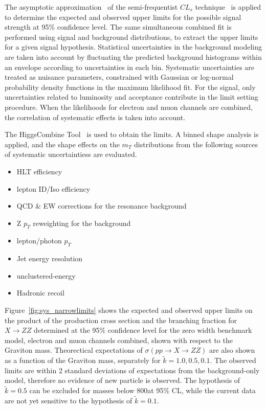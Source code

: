 \vspace{0.3cm}
The asymptotic approximation~\cite{sys_cls0} of the semi-frequentist $CL_s$ technique~\cite{sys_cls1,sys_cls2,sys_cls3} is applied to determine the expected and observed upper limits for the possible signal strength at 95\% confidence level. The same simultaneous combined fit is performed using signal and background distributions, to extract the upper limits for a given signal hypothesis. Statistical uncertainties in the background modeling are taken into account by fluctuating the predicted background histograms within an envelope according to uncertainties in each bin. Systematic uncertainties are treated as nuisance parameters, constrained with Gaussian or log-normal probability density functions in the maximum likelihood fit. For the signal, only uncertainties related to luminosity and acceptance contribute in the limit setting procedure. When the likelihoods for electron and muon channels are combined, the correlation of systematic effects is taken into account. 

\vspace{0.3cm}
The HiggsCombine Tool~\cite{sys_higgscombinetool} is used to obtain the limits. A binned shape analysis is applied, and the shape effects on the $m_T$ distributions from the following sources of systematic uncertaintiess are evaluated.
\begin{itemize}
\item HLT efficiency
\item lepton ID/Iso efficiency
\item QCD \& EW corrections for the resonance background
\item Z $p_T$ reweighting for the \Zjets background
\item \ptmiss lepton/photon $p_T$
\item \ptmiss Jet energy resolution
\item \ptmiss unclustered-energy
\item \ptmiss Hadronic recoil 
\end{itemize}

\vspace{0.3cm}
Figure~\ref{fig:sys_narrowlimits} shows the expected and observed upper limits on the product of the production cross section and the branching fraction for $X\rightarrow ZZ$ determined at the 95\% confidence level for the zero width benchmark model, electron and muon channels combined, shown with respect to the Graviton mass. Theorectical expectations of $\sigma(pp\rightarrow X\rightarrow ZZ)$ are also shown as a function of the Graviton mass, separately for $\tilde{k}=1.0,0.5,0.1$. The observed limits are within 2 standard deviations of expectations from the background-only model, therefore no evidence of new particle is observed. The hypothesis of $\tilde{k}=0.5$ can be excluded for masses below 800\GeV at 95\% CL, while the current data are not yet sensitive to the hypothesis of $\tilde{k}=0.1$. 

